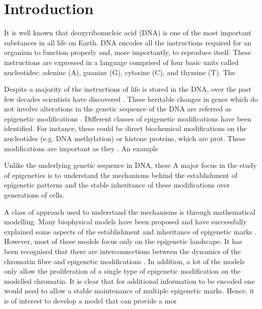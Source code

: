 \documentclass[12pt]{article}
\begin{document}
\section{Introduction}



It is well known that deoxyribonucleic acid (DNA) is one of the most important substances in all life on Earth. DNA encodes all the instructions required for an organism to function properly and, more importantly, to reproduce itself. These instructions are expressed in a language comprised of four basic units called nucleotides: adenine (A), guanine (G), cytosine (C), and thymine (T). The 

Despite a majority of the instructions of life is stored in the DNA, over the past few decades scientists have discovered . These heritable changes in genes which do not involve alterations in the genetic sequence of the DNA are referred as epigenetic modifications \cite{DNABook, probst2009}. Different classes of epigenetic modifications have been identified. For instance, these could be direct biochemical modifications on the nucleotides (e.g. DNA methylation) or histone proteins, which are prot. These modifications are important as they . An example 

Unlike the underlying genetic sequence in DNA, these 
A major focus in the study of epigenetics is to understand the mechanisms behind the establishment of epigenetic patterns and the stable inheritance of these modifications over generations of cells.

A class of approach used to understand the mechanisms is through mathematical modelling. Many biophysical models have been proposed and have successfully explained some aspects of the establishment and inheritance of epigenetic marks \cite{dodd2007, zhang2014, jost2014}. However, most of these models focus only on the epigenetic landscape. It has been recognised that there are interconnections between the dynamics of the chromatin fibre and epigenetic modifications \cite{}. In addition, a lot of the models only allow the proliferation of a single type of epigenetic modification on the modelled chromatin. It is clear that for additional information to be encoded one would need to allow a stable maintenance of multiple epigenetic marks. Hence, it is of interest to develop a model that can provide a mor
\end{document}
